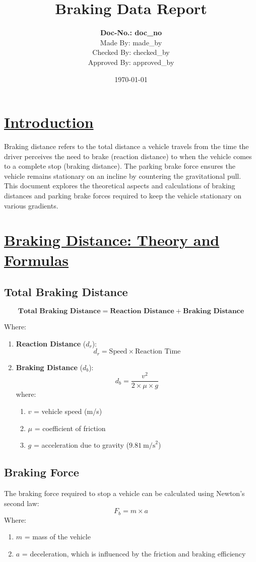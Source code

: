 \documentclass[14pt]{article}
\title{Braking Data Report}
\author{
    \textbf{Doc-No.: {{ doc_no }} } \\
    Made By: {{ made_by }} \\
    Checked By: {{ checked_by }} \\
    Approved By: {{ approved_by }}
}
\date{\today}
\begin{document}
\maketitle
\section*{\underline{Introduction}}
Braking distance refers to the total distance a vehicle travels from the time the driver perceives the need to brake (reaction distance) to when the vehicle comes to a complete stop (braking distance). The parking brake force ensures the vehicle remains stationary on an incline by countering the gravitational pull.\\

This document explores the theoretical aspects and calculations of braking distances and parking brake forces required to keep the vehicle stationary on various gradients.

\section{\underline{Braking Distance: Theory and Formulas}}

\subsection{Total Braking Distance}

\[
\textbf{Total Braking Distance} = \textbf{Reaction Distance} + \textbf{Braking Distance}
\]


Where:

\begin{enumerate}
    \item \textbf{Reaction Distance} ($d_r$):
    \[
    d_r = \text{Speed} \times \text{Reaction Time}
    \]
    \item \textbf{Braking Distance} ($d_b$):
    \[
    d_b = \frac{v^2}{2 \times \mu \times g}
    \]
where:
\begin{enumerate}
    \item $v$ = vehicle speed (m/s)
    \item $\mu$ = coefficient of friction
    \item $g$ = acceleration due to gravity ($9.81~\text{m/s}^2$)
\end{enumerate}
\end{enumerate}
\subsection{Braking Force}
The braking force required to stop a vehicle can be calculated using Newton's second law:
\[
F_b = m \times a
\]
\newpage
Where:
\begin{enumerate}
    \item $m$ = mass of the vehicle
    \item $a$ = deceleration, which is influenced by the friction and braking efficiency
\end{enumerate}
\end{document}
